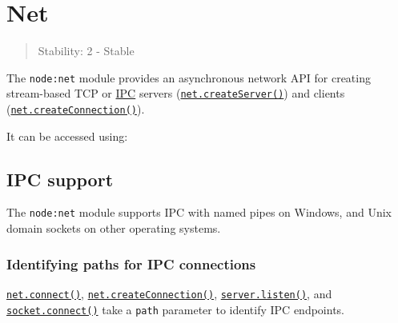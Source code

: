 \section{Net}\label{net}

\begin{quote}
Stability: 2 - Stable
\end{quote}

The \texttt{node:net} module provides an asynchronous network API for
creating stream-based TCP or \hyperref[ipc-support]{IPC} servers
(\hyperref[netcreateserveroptions-connectionlistener]{\texttt{net.createServer()}})
and clients
(\hyperref[netcreateconnection]{\texttt{net.createConnection()}}).

It can be accessed using:

\begin{Shaded}
\begin{Highlighting}[]
\OperatorTok{=} \NormalTok{(}\NormalTok{)}\OperatorTok{;}
\end{Highlighting}
\end{Shaded}

\subsection{IPC support}\label{ipc-support}

The \texttt{node:net} module supports IPC with named pipes on Windows,
and Unix domain sockets on other operating systems.

\subsubsection{Identifying paths for IPC
connections}\label{identifying-paths-for-ipc-connections}

\hyperref[netconnect]{\texttt{net.connect()}},
\hyperref[netcreateconnection]{\texttt{net.createConnection()}},
\hyperref[serverlisten]{\texttt{server.listen()}}, and
\hyperref[socketconnect]{\texttt{socket.connect()}} take a \texttt{path}
parameter to identify IPC endpoints.

